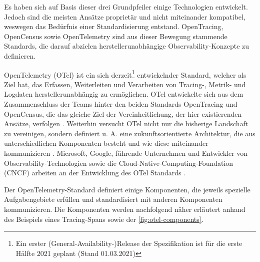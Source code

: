 
Es haben sich auf Basis dieser drei Grundpfeiler einige Technologien entwickelt. Jedoch sind die meisten Ansätze proprietär und nicht miteinander kompatibel, weswegen das Bedürfnis einer Standardisierung entstand. OpenTracing, OpenCensus \cite{OpenCensus} sowie OpenTelemetry \cite{OpenTelemetry} sind aus dieser Bewegung stammende Standards, die darauf abzielen herstellerunabhängige Observability-Konzepte zu definieren.

OpenTelemetry (OTel) ist ein sich derzeit\footnote{Ein erster (General-Availability-)Release der Spezifikation ist für die erste Hälfte 2021 geplant \cite{OpenTelemetryGARelease} (Stand 01.03.2021)} entwickelnder Standard, welcher als Ziel hat, das Erfassen, Weiterleiten und Verarbeiten von Tracing-, Metrik- und Logdaten\footnotemark{} herstellerunabhängig zu ermöglichen. OTel entwickelte sich aus dem Zusammenschluss der Teams hinter den beiden Standards OpenTracing und OpenCensus, die das gleiche Ziel der Vereinheitlichung, der hier existierenden Ansätze, verfolgen  \cite{UseNixDistributiveTracing}. Weiterhin versucht OTel nicht nur die bisherige Landschaft zu vereinigen, sondern definiert u. A. eine zukunftsorientierte Architektur, die aus unterschiedlichen Komponenten besteht und wie diese miteinander kommunizieren \cite{DistributedTracingInPractice}. Microsoft, Google, führende Unternehmen und Entwickler von Observability-Technologien sowie die Cloud-Native-Computing-Foundation (CNCF) arbeiten an der Entwicklung des OTel Standards \cite{DistributedTracingInPractice} \cite{OpenTelemetryCommunityMembers}.


Der OpenTelemetry-Standard definiert einige Komponenten, die jeweils spezielle Aufgabengebiete erfüllen und standardisiert mit anderen Komponenten kommunizieren. Die Komponenten werden nachfolgend näher erläutert anhand des Beispiels eines Tracing-Spans sowie der \autoref{fig:otel-components}.

